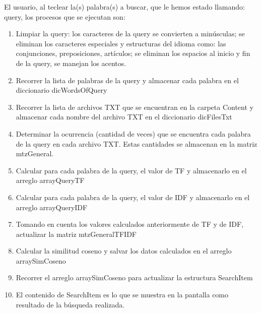 \documentclass[10pt,a4paper]{article}
\begin{document}
El usuario, al teclear la(s) palabra(s) a buscar, que le hemos estado llamando: query, los procesos 
que se ejecutan son:\\
\begin{enumerate}
\item Limpiar la query: los caracteres de la query se convierten a minúsculas; se eliminan los 
caracteres especiales y estructuras del idioma como: las conjunciones, preposiciones, 
artículos; se eliminan los espacios al inicio y fin de la query, se manejan los acentos.\\

\item Recorrer la lista de palabras de la query y almacenar cada palabra en el diccionario 
dicWordsOfQuery\\

\item Recorrer la lista de archivos TXT que se encuentran en la carpeta Content y almacenar 
cada nombre del archivo TXT en el diccionario dicFilesTxt\\

\item Determinar la ocurrencia (cantidad de veces) que se encuentra cada palabra de la query
en cada archivo TXT. Estas cantidades se almacenan en la matriz mtzGeneral.\\

\item Calcular para cada palabra de la query, el valor de TF y almacenarlo en el arreglo 
arrayQueryTF\\

\item Calcular para cada palabra de la query, el valor de IDF y almacenarlo en el arreglo 
arrayQueryIDF\\

\item Tomando en cuenta los valores calculados anteriormente de TF y de IDF, actualizar la 
matriz mtzGeneralTFIDF\\

\item Calcular la similitud coseno y salvar los datos calculados en el arreglo arraySimCoseno\\

\item Recorrer el arreglo arraySimCoseno para actualizar la estructura SearchItem\\

\item El contenido de SearchItem es lo que se muestra en la pantalla como resultado de la 
búsqueda realizada.\\
\end{enumerate}
\end{document}
